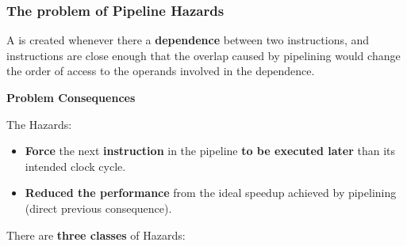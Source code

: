 \subsubsection{The problem of Pipeline Hazards}\label{subsubsection: The problem of Pipeline Hazards}

\begin{definitionbox}[: Hazard]
    A  is created whenever there a \textbf{dependence} between two instructions, and instructions are close enough that the overlap caused by pipelining would change the order of access to the operands involved in the dependence.
\end{definitionbox}

\begin{flushleft}
    \textcolor{Red2}{ \textbf{Problem Consequences}}
\end{flushleft}
The Hazards:
\begin{itemize}
    \item \textbf{Force} the next \textbf{instruction} in the pipeline \textbf{to be executed later} than its intended clock cycle.

    \item \textbf{Reduced the performance} from the ideal speedup achieved by pipelining (direct previous consequence).
\end{itemize}
There are \textbf{three classes} of Hazards:
